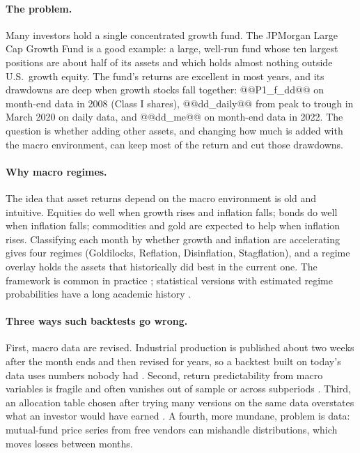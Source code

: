 \documentclass[11pt,a4paper]{article}
\begin{document}
\paragraph{The problem.} Many investors hold a single concentrated growth fund. The JPMorgan Large Cap Growth
Fund is a good example: a large, well-run fund whose ten largest positions are about half of its assets and
which holds almost nothing outside U.S.\ growth equity. The fund's returns are excellent in most years, and its
drawdowns are deep when growth stocks fall together: @@P1_f_dd@@ on month-end data in 2008 (Class I shares),
@@dd_daily@@ from peak to trough in March 2020 on daily data, and @@dd_me@@ on month-end data in 2022. The
question is whether adding other assets, and changing how much is added with the macro environment, can keep
most of the return and cut those drawdowns.

\paragraph{Why macro regimes.} The idea that asset returns depend on the macro environment is old and
intuitive. Equities do well when growth rises and inflation falls; bonds do well when inflation falls;
commodities and gold are expected to help when inflation rises. Classifying each month by whether growth and
inflation are accelerating gives four regimes (Goldilocks, Reflation, Disinflation, Stagflation), and a
regime overlay holds the assets that historically did best in the current one. The framework is common in
practice \citep{ilmanen2011}; statistical versions with estimated regime probabilities have a long academic
history \citep{ang2002}.

\paragraph{Three ways such backtests go wrong.} First, macro data are revised. Industrial production is
published about two weeks after the month ends and then revised for years, so a backtest built on today's
data uses numbers nobody had \citep{croushore2001,orphanides2001}. Second, return predictability from macro
variables is fragile and often vanishes out of sample or across subperiods \citep{welch2008}. Third, an
allocation table chosen after trying many versions on the same data overstates what an investor would have
earned \citep{harvey2016,bailey2014}. A fourth, more mundane, problem is data: mutual-fund price series from
free vendors can mishandle distributions, which moves losses between months.
\end{document}
